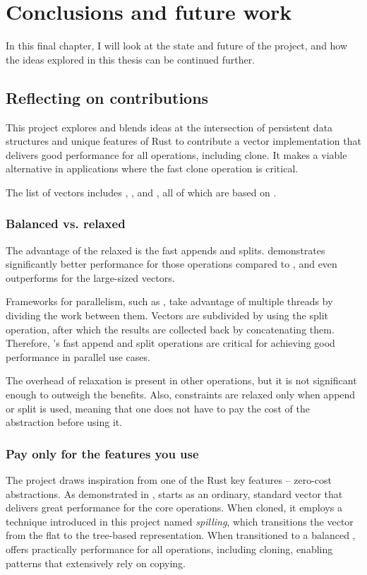 \chapter{Conclusions and future work}
In this final chapter, I will look at the state and future of the \pvecrs{} project, and how the ideas explored in this thesis can be continued further.

\section{Reflecting on contributions}
This project explores and blends ideas at the intersection of persistent data structures and unique features of Rust to contribute a vector implementation that delivers good performance for all operations, including clone. It makes \pvecrs{} a viable alternative in applications where the fast clone operation is critical.

The list of vectors includes \rbvec{}, \rrbvec{}, and \pvec{}, all of which are based on \rrbtree{}.

\subsection{Balanced vs. relaxed}
The advantage of the relaxed \rbtree{} is the fast appends and splits. \rrbvec{} demonstrates significantly better performance for those operations compared to \rbvec{}, and even outperforms \stdvec{} for the large-sized vectors.

Frameworks for parallelism, such as \rayon{}, take advantage of multiple threads by dividing the work between them. Vectors are subdivided by using the split operation, after which the results are collected back by concatenating them. Therefore, \rrbtree{}'s fast append and split operations are critical for achieving good performance in parallel use cases.

The overhead of relaxation is present in other operations, but it is not significant enough to outweigh the benefits. Also, constraints are relaxed only when append or split is used, meaning that one does not have to pay the cost of the abstraction before using it.

\subsection{Pay only for the features you use}
The project draws inspiration from one of the Rust key features -- zero-cost abstractions. As demonstrated in , \pvec{} starts as an ordinary, standard vector that delivers great performance for the core operations. When cloned, it employs a technique introduced in this project named \emph{spilling}, which transitions the vector from the flat to the tree-based representation. When transitioned to a balanced \rrbvec{}, \pvec{} offers practically  performance for all operations, including cloning, enabling patterns that extensively rely on copying.

